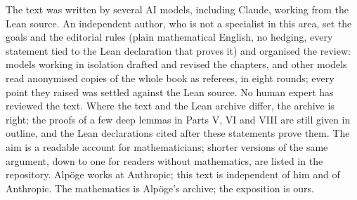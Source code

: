 The text was written by several AI models, including Claude, working from the Lean source. An independent author, who is not a specialist in this area, set the goals and the editorial rules (plain mathematical English, no hedging, every statement tied to the Lean declaration that proves it) and organised the review: models working in isolation drafted and revised the chapters, and other models read anonymised copies of the whole book as referees, in eight rounds; every point they raised was settled against the Lean source. No human expert has reviewed the text. Where the text and the Lean archive differ, the archive is right; the proofs of a few deep lemmas in Parts V, VI and VIII are still given in outline, and the Lean declarations cited after these statements prove them. The aim is a readable account for mathematicians; shorter versions of the same argument, down to one for readers without mathematics, are listed in the repository. Alpöge works at Anthropic; this text is independent of him and of Anthropic. The mathematics is Alpöge's archive; the exposition is ours.
